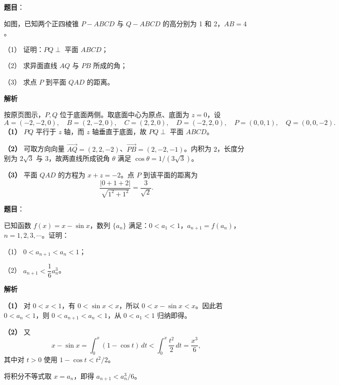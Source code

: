 \begin{answer}

\textbf{题目}：

如图，已知两个正四棱锥 $P-ABCD$ 与 $Q-ABCD$ 的高分别为 1 和 2，$AB=4$。

（1） 证明：$PQ\perp$ 平面 $ABCD$；

（2） 求异面直线 $AQ$ 与 $PB$ 所成的角；

（3） 求点 $P$ 到平面 $QAD$ 的距离。
\nopagebreak[4]
\begin{center}\end{center}
\nopagebreak[4]
\textbf{解析}

按原页图示，$P,Q$ 位于底面两侧。取底面中心为原点、底面为 $z=0$，设
\nopagebreak[4]
\[
A=(-2,-2,0),\quad B=(2,-2,0),\quad C=(2,2,0),\quad D=(-2,2,0),\quad P=(0,0,1),\quad Q=(0,0,-2).
\]
\textbf{（1）} $PQ$ 平行于 $z$ 轴，而 $z$ 轴垂直于底面，故 $PQ\perp$ 平面 $ABCD$。

\textbf{（2）} 可取方向向量 $\overrightarrow{AQ}=(2,2,-2)$、$\overrightarrow{PB}=(2,-2,-1)$。内积为 $2$，长度分别为 $2\sqrt3$ 与 $3$，故两直线所成锐角 $\theta$ 满足 $\cos\theta=1/(3\sqrt3)$。

\textbf{（3）} 平面 $QAD$ 的方程为 $x+z=-2$。点 $P$ 到该平面的距离为
\nopagebreak[4]
\[
\frac{|0+1+2|}{\sqrt{1^2+1^2}}=\frac3{\sqrt2}.
\]
\nopagebreak[4]
\begin{center}\end{center}
\nopagebreak[4]



\end{answer}
\begin{answer}

\textbf{题目}：

已知函数 $f(x)=x-\sin x$，数列 $\{a_n\}$ 满足：$0<a_1<1$，$a_{n+1}=f(a_n)$，$n=1,2,3,\cdots$。证明：

（1） $0<a_{n+1}<a_n<1$；

（2） $a_{n+1}<\dfrac16a_n^3$。

\textbf{解析}

\textbf{（1）} 对 $0<x<1$，有 $0<\sin x<x$，所以 $0<x-\sin x<x$。因此若 $0<a_n<1$，则 $0<a_{n+1}<a_n<1$，从 $0<a_1<1$ 归纳即得。

\textbf{（2）} 又
\nopagebreak[4]
\[
x-\sin x=\int_0^x(1-\cos t)\,dt<\int_0^x\frac{t^2}{2}\,dt=\frac{x^3}{6},
\]
其中对 $t>0$ 使用 $1-\cos t<t^2/2$。

将积分不等式取 $x=a_n$，即得 $a_{n+1}<a_n^3/6$。



\end{answer}
